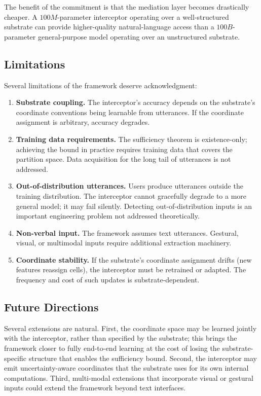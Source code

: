 \documentclass[11pt,twocolumn,a4paper]{article}
\theoremstyle{definition}
\theoremstyle{remark}
\begin{document}
The benefit of the commitment is that the mediation layer becomes drastically cheaper. A $100M$-parameter interceptor operating over a well-structured substrate can provide higher-quality natural-language access than a $100B$-parameter general-purpose model operating over an unstructured substrate.

\subsection{Limitations}

Several limitations of the framework deserve acknowledgment:

\begin{enumerate}
    \item \textbf{Substrate coupling.} The interceptor's accuracy depends on the substrate's coordinate conventions being learnable from utterances. If the coordinate assignment is arbitrary, accuracy degrades.

    \item \textbf{Training data requirements.} The sufficiency theorem is existence-only; achieving the bound in practice requires training data that covers the partition space. Data acquisition for the long tail of utterances is not addressed.

    \item \textbf{Out-of-distribution utterances.} Users produce utterances outside the training distribution. The interceptor cannot gracefully degrade to a more general model; it may fail silently. Detecting out-of-distribution inputs is an important engineering problem not addressed theoretically.

    \item \textbf{Non-verbal input.} The framework assumes text utterances. Gestural, visual, or multimodal inputs require additional extraction machinery.

    \item \textbf{Coordinate stability.} If the substrate's coordinate assignment drifts (new features reassign cells), the interceptor must be retrained or adapted. The frequency and cost of such updates is substrate-dependent.
\end{enumerate}

\subsection{Future Directions}

Several extensions are natural. First, the coordinate space may be learned jointly with the interceptor, rather than specified by the substrate; this brings the framework closer to fully end-to-end learning at the cost of losing the substrate-specific structure that enables the sufficiency bound. Second, the interceptor may emit uncertainty-aware coordinates that the substrate uses for its own internal computations. Third, multi-modal extensions that incorporate visual or gestural inputs could extend the framework beyond text interfaces.
\end{document}
